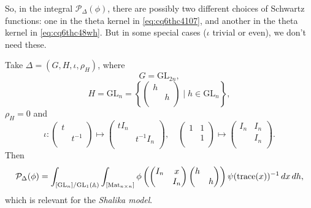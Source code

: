 \documentclass[reqno]{amsart} 
\numberwithin{theorem}{section}
\numberwithin{equation}{section}
\numberwithin{exercise}{section}
\begin{document}
\begin{enumerate}
  So, in the integral $\mathcal{P}_\Delta(\phi)$, there are possibly two different choices of Schwartz functions: one in the theta kernel in \eqref{eq:cq6thc4107}, and another in the theta kernel in \eqref{eq:cq6thc48wh}.  But in some special cases ($\iota$ trivial or even), we don't need these.
\end{enumerate}

\begin{example}\label{example:cq6tho3o9b}
  Take $\Delta =(G, H, \iota, \rho_H)$, where
  \begin{equation*}
    G =\mathrm{GL}_{2 n},
  \end{equation*}
  \begin{equation*}
    H = \mathrm{GL}_n = \left\{
      \begin{pmatrix}
        h        &  \\
                 & h \\
      \end{pmatrix} \mid h \in \mathrm{GL}_n \right\},
  \end{equation*}
  $\rho_H = 0$ and
  \begin{equation*}
    \iota :
    \begin{pmatrix}
      t      &  \\
             & t^{-1} \\
    \end{pmatrix}
    \mapsto
    \begin{pmatrix}
      t I_n &  \\
            & t^{-1} I_n \\
    \end{pmatrix},
    \quad
    \begin{pmatrix}
      1 & 1 \\
        & 1 \\
    \end{pmatrix}
    \mapsto
    \begin{pmatrix}
      I_n      & I_n \\
               & I_n \\
    \end{pmatrix}.
  \end{equation*}
  Then
  \begin{equation*}
    \mathcal{P}_\Delta(\phi) =
    \int_{[\mathrm{GL}_n] / \mathrm{GL}_1(\mathbb{A})}
    \int_{[\operatorname{Mat}_{n \times n}]} \phi \left(
      \begin{pmatrix}
        I_n      & x \\
                 & I_n \\
      \end{pmatrix}
      \begin{pmatrix}
        h &  \\
          & h \\
      \end{pmatrix}      
    \right)
    \psi(\operatorname{trace}(x))^{-1} \, d x
    \, d h,
  \end{equation*}
  which is relevant for the \emph{Shalika model}.
\end{example}
\end{document}
